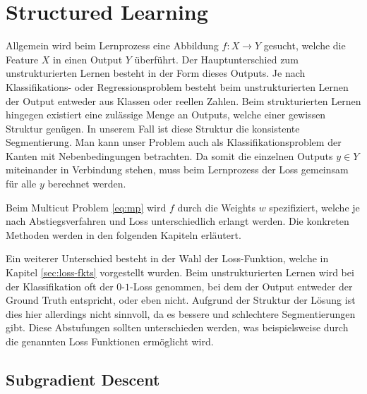 \section{Structured Learning}\label{sec:strucLearn}

Allgemein wird beim Lernprozess eine Abbildung $f: X \rightarrow Y$ gesucht, welche die Feature $X$ in einen Output $Y$ überführt. Der Hauptunterschied zum unstrukturierten Lernen besteht in der Form dieses Outputs. Je nach Klassifikations- oder Regressionsproblem besteht beim unstrukturierten Lernen der Output entweder aus Klassen oder reellen Zahlen. Beim strukturierten Lernen hingegen existiert eine zulässige Menge an Outputs, welche einer gewissen Struktur genügen. In unserem Fall ist diese Struktur die konsistente Segmentierung. Man kann unser Problem auch als Klassifikationsproblem der Kanten mit Nebenbedingungen betrachten. Da somit die einzelnen Outputs $y \in Y$ miteinander in Verbindung stehen, muss beim Lernprozess der Loss gemeinsam für alle $y$ berechnet werden.

Beim Multicut Problem \eqref{eq:mp} wird $f$ durch die Weights $w$ spezifiziert, welche je nach Abstiegsverfahren und Loss unterschiedlich erlangt werden. Die konkreten Methoden werden in den folgenden Kapiteln erläutert. 

Ein weiterer Unterschied besteht in der Wahl der Loss-Funktion, welche in Kapitel \ref{sec:loss-fkts} vorgestellt wurden. Beim unstrukturierten Lernen wird bei der Klassifikation oft der $0$-$1$-Loss genommen, bei dem der Output entweder der Ground Truth entspricht, oder eben nicht. Aufgrund der Struktur der Lösung ist dies hier allerdings nicht sinnvoll, da es bessere und schlechtere Segmentierungen gibt. Diese Abstufungen sollten unterschieden werden, was beispielsweise durch die genannten Loss Funktionen ermöglicht wird.





\subsection{Subgradient Descent}

